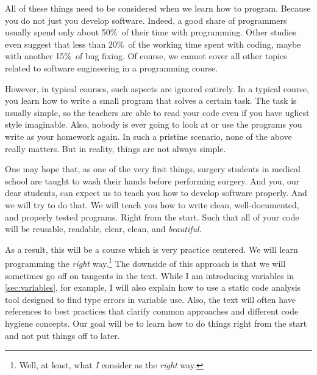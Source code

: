 All of these things need to be considered when we learn how to program.
Because you do not just  you develop software.
Indeed, a good share of programmers usually spend only about 50\%~of their time with programming.
Other studies even suggest that less than 20\%~of the working time spent with coding, maybe with another 15\%~of bug fixing.
Of course, we cannot cover all other topics related to software engineering in a programming course.

However, in typical courses, such aspects are ignored entirely.
In a typical course, you learn how to write a small program that solves a certain task.
The task is usually simple, so the teachers are able to read your code even if you have ugliest style imaginable.
Also, nobody is ever going to look at or use the programs you write as your homework again.
In such a pristine scenario, none of the above really matters.
But in reality, things are not always simple.

One may hope that, as one of the very first things, surgery students in medical school are taught to wash their hands before performing surgery.
And you, our dear students, can expect us to teach you how to develop software properly.
And we will try to do that.
We will teach you how to write clean, well-documented, and properly tested programs.
Right from the start.
Such that all of your code will be reusable, readable, clear, clean, and \emph{beautiful}.

As a result, this will be a course which is very practice centered.
We will learn programming the \emph{right} way.\footnote{%
Well, at least, what \emph{I} consider as the \emph{right} way.%
}
The downside of this approach is that we will sometimes go off on tangents in the text.
While I am introducing variables in \cref{sec:variables}, for example, I will also explain how to use a static code analysis tool designed to find type errors in variable use.
Also, the text will often have references to best practices that clarify common approaches and different code hygiene concepts.
Our goal will be to learn how to do things right from the start and not put things off to later.%
%
\endhsection%
%
